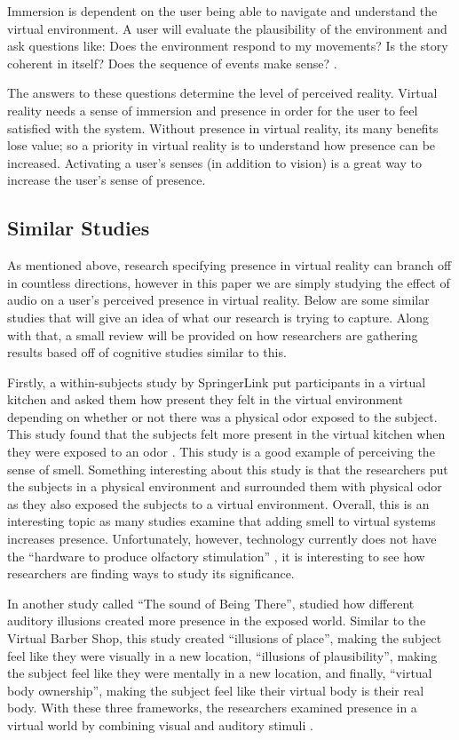 \documentclass[manuscript,screen,review]{acmart}
\begin{document}
Immersion is dependent on the user being able to navigate and understand the virtual environment. A user will evaluate the plausibility of the environment and  ask questions like: Does the environment respond to my movements? Is the story coherent in itself? Does the sequence of events make sense? \cite{WEBER}. 

The answers to these questions determine the level of perceived reality. Virtual reality needs a sense of immersion and presence in order for the user to feel satisfied with the system. Without presence in virtual reality, its many benefits lose value; so a priority in virtual reality is to understand how presence can be increased. Activating a user’s senses (in addition to vision) is a great way to increase the user’s sense of presence. 


 
\subsection{Similar Studies}
As mentioned above, research specifying presence in virtual reality can branch off in countless directions, however in this paper we are simply studying the effect of audio on a user's perceived presence in virtual reality. Below are some similar studies that will give an idea of what our research is trying to capture. Along with that, a small review will be provided on how researchers are gathering results based off of cognitive studies similar to this.

Firstly, a within-subjects study by SpringerLink put participants in a virtual kitchen and asked them how present they felt in the virtual environment depending on whether or not there was a physical odor exposed to the subject. This study found that the subjects felt more present in the virtual kitchen when they were exposed to an odor \cite{BAUS}. This study is a good example of perceiving the sense of smell. Something interesting about this study is that the researchers put the subjects in a physical environment and surrounded them with physical odor as they also exposed the subjects to a virtual environment. Overall, this is an interesting topic as many studies examine that adding smell to virtual systems increases presence. Unfortunately, however, technology currently does not have the “hardware to produce olfactory stimulation” \cite{ZYBURA}, it is interesting to see how researchers are finding ways to study its significance.

In another study called “The sound of Being There”, studied how different auditory illusions created more presence in the exposed world. Similar to the Virtual Barber Shop, this study created “illusions of place”, making the subject feel like they were visually in a new location, “illusions of plausibility”, making the subject feel like they were mentally in a new location, and finally, “virtual body ownership”, making the subject feel like their virtual body is their real body. With these three frameworks, the researchers examined presence in a virtual world by combining visual and auditory stimuli \cite{NORDAHL}.
\end{document}
